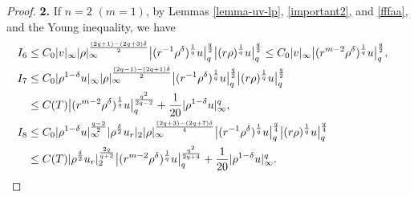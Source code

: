 \documentclass[11pt,reqno]{amsart}
\numberwithin{rk}{section}
\numberwithin{prop}{section}
\numberwithin{mydef}{section}
\numberwithin{lem}{section}
\numberwithin{equation}{section}
\numberwithin{thm}{section}
\begin{document}
\begin{proof}
\smallskip
\textbf{2.} If $n=2$ $(m=1)$,  by Lemmas \ref{lemma-uv-lp}, \ref{important2}, and \ref{fffaa}, and the Young inequality, we have
\begin{align}
&\begin{aligned}
I_6&\leq C_0|v|_\infty|\rho|_\infty^\frac{(2q+1)-(2q+3)\delta}{2}  \big|(r^{-1}\rho^\delta)^\frac{1}{q}u\big|_q^\frac{q}{2} \big|(r\rho)^\frac{1}{q}u\big|_q^\frac{q}{2}\leq C_0|v|_\infty\big|(r^{m-2}\rho^\delta)^\frac{1}{q}u\big|_q^\frac{q}{2},\notag 
\end{aligned}\\
&\begin{aligned}[b]
I_7&\leq C_0|\rho^{1-\delta}u|_\infty|\rho|_\infty^\frac{(2q-1)-(2q+1)\delta}{2} \big|(r^{-1}\rho^\delta)^\frac{1}{q}u\big|_q^\frac{q}{2} \big|(r\rho)^\frac{1}{q}u\big|_q^\frac{q}{2} \\
&\leq C(T)\big|(r^{m-2}\rho^\delta)^\frac{1}{q}u\big|_q^\frac{q^2}{2q-2}+\frac{1}{20}|\rho^{1-\delta}u|_\infty^{q},
\end{aligned}\label{5122'}\\
&\begin{aligned}
I_{8}&\leq C_0|\rho^{1-\delta}u|_\infty^\frac{q-2}{2}|\rho^\frac{\delta}{2}u_r|_2|\rho|_\infty^{\frac{(2q+3)-(2q+7)\delta}{4}} \big|(r^{-1}\rho^\delta)^\frac{1}{q}u\big|_q^\frac{q}{4}\big|(r\rho)^\frac{1}{q}u\big|_q^\frac{q}{4}\notag\\
&\leq C(T)|\rho^\frac{\delta}{2}u_r|_2^\frac{2q}{q+2}\big|(r^{m-2}\rho^\delta)^\frac{1}{q}u\big|_q^\frac{q^2}{2q+4} +\frac{1}{20}|\rho^{1-\delta}u|_\infty^{q}.
\end{aligned}
\end{align}


\end{proof}
\end{document}
